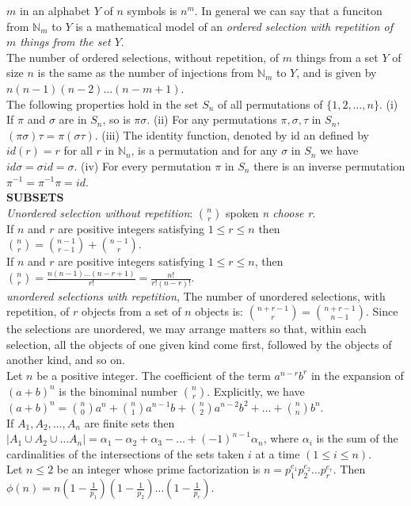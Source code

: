 \documentclass[10pt,landscape]{article}
\begin{document}
\begin{multicols}{4}
$m$ in an alphabet $Y$ of $n$ symbols is $n^{m}$. In general we can
say that a funciton from $\mathbb{N}_{m}$ to $Y$ is a mathematical
model of an \textit{ordered selection with repetition of $m$ things
  from the set $Y$}.\\
The number of ordered selections, without repetition, of $m$ things
from a set $Y$ of size $n$ is the same as the number of injections
from $\mathbb{N}_{m}$ to $Y$, and is given by $n(n-1)(n-2)\dots(n-m+1)$.\\
The following properties hold in the set $S_{n}$ of all permutations
of $\{1,2,\dots,n\}$. (i) If $\pi$ and $\sigma$ are in $S_{n}$, so is
$\pi\sigma$. (ii) For any permutations $\pi, \sigma, \tau$ in $S_{n}$,
$(\pi\sigma)\tau = \pi(\sigma\tau)$.
(iii) The identity function, denoted by id an defined by $id(r) = r$
for all $r$ in $\mathbb{N}_{n}$, is a permutation and for any $\sigma$
in $S_{n}$ we have $id \sigma = \sigma id = \sigma$.
(iv) For every permutation $\pi$ in $S_{n}$ there is an inverse
permutation $\pi^{-1} = \pi^{-1}\pi = id$.\\
\textbf{SUBSETS}\\
\textit{Unordered selection without repetition}: $\binom{n}{r}$ spoken
\textit{n choose r}. \\
If $n$ and $r$ are positive integers satisfying $1 \leq r \leq n$ then
$\binom{n}{r} = \binom{n-1}{r-1} + \binom{n-1}{r}$.\\
If $n$ and $r$ are positive integers satisfying $1 \leq r \leq n$,
then $\binom{n}{r} =
\frac{n(n-1)\dots (n-r+1)}{r!}=\frac{n!}{r!(n-r)!}$.\\
\textit{unordered selections with repetition}, The number of unordered
selections, with repetition, of $r$ objects from a set of $n$ objects
is: $\binom{n+r-1}{r} = \binom{n+r-1}{n-1}$. Since the selections are
unordered, we may arrange matters so that, within each selection, all
the objects of one given kind come first, followed by the objects of
another kind, and so on.\\
Let $n$ be a positive integer. The coefficient of the term
$a^{n-r}b^{r}$ in the expansion of $(a + b)^{n}$ is the binominal
number $\binom{n}{r}$. Explicitly, we have
$(a+b)^{n}=\binom{n}{0}a^{n}+ \binom{n}{1}a^{n-1}b+ \binom{n}{2}a^{n-2}b^{2}+\dots+\binom{n}{n}b^{n}$.\\
If $A_{1},A_{2},\dots,A_{n}$ are finite sets then $|A_{1} \cup A_{2}
\cup \dots A_{n}| =
\alpha_{1}-\alpha_{2}+\alpha_{3}-\dots+(-1)^{n-1}\alpha_{n}$, where
$\alpha_{i}$ is the sum of the cardinalities of the intersections of
the sets taken $i$ at a time $(1 \leq i \leq n)$.\\
Let $n \leq 2$ be an integer whose prime factorization is $n =
p_{1}^{e_{1}}p_{2}^{e_{2}}\dots p_{r}^{e_{r}}$. Then $\phi (n) =
n(1-\frac{1}{p_{1}})(1- \frac{1}{p_{2}})\dots (1- \frac{1}{p_{r}})$.


\end{multicols}
\end{document}
